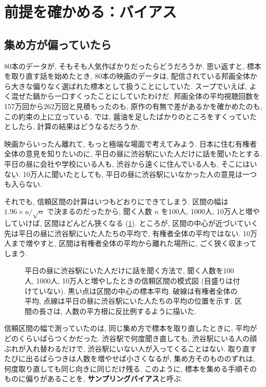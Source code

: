 \section{前提を確かめる：バイアス}

  \subsection{集め方が偏っていたら}

    80本のデータが, そもそも人気作ばかりだったらどうだろうか.
    思い返すと, 標本を取り直す話を始めたとき, 80本の映画のデータは, 配信されている邦画全体から大きな偏りなく選ばれた標本として扱うことにしていた.
    スープでいえば, よく混ぜた鍋から一口すくったことにしていたわけだ.
    邦画全体の平均視聴回数を157万回から262万回と見積もったのも, 原作の有無で差があるかを確かめたのも, この約束の上に立っている.
    では, 醤油を足したばかりのところをすくっていたとしたら, 計算の結果はどうなるだろうか.

    映画からいったん離れて, もっと極端な場面で考えてみよう.
    日本に住む有権者全体の意見を知りたいのに, 平日の昼に渋谷駅にいた人だけに話を聞いたとする.
    平日の昼に会社や学校にいる人も, 渋谷から遠くに住んでいる人も, そこにはいない.
    10万人に聞いたとしても, 平日の昼に渋谷駅にいなかった人の意見は一つも入らない.

    それでも, 信頼区間の計算はいつもどおりにできてしまう.
    区間の幅は $1.96 \times u / \sqrt{n}$ で決まるのだったから, 聞く人数 $n$ を100人, 1000人, 10万人と増やしていけば, 区間はどんどん狭くなる (\cref{fig:ch07-biased-n}).
    ところが, 区間の中心が近づいていく先は平日の昼に渋谷駅にいた人たちの平均で, 有権者全体の平均ではない.
    10万人まで増やすと, 区間は有権者全体の平均から離れた場所に, ごく狭く収まってしまう.

    \begin{figure}[htbp]
      \centering
      
      \caption{平日の昼に渋谷駅にいた人だけに話を聞く方法で, 聞く人数を100人, 1000人, 10万人と増やしたときの信頼区間の模式図 (目盛りは付けていない). 黒い点は区間の中心の標本平均. 破線は有権者全体の平均, 点線は平日の昼に渋谷駅にいた人たちの平均の位置を示す. 区間の長さは, 人数の平方根に反比例するように描いた.}
      \label{fig:ch07-biased-n}
    \end{figure}

    信頼区間の幅で測っていたのは, 同じ集め方で標本を取り直したときに, 平均がどのくらいばらつくかだった.
    渋谷駅で何度聞き直しても, 渋谷駅にいる人の顔ぶれが入れ替わるだけで, 渋谷駅にいない人が入ってくることはない.
    取り直すたびに出るばらつきは人数を増やせば小さくなるが, 集め方そのもののずれは, 何度取り直しても同じ向きに同じだけ残る.
    このように, 標本を集める手順そのものに偏りがあることを, \textbf{サンプリングバイアス}と呼ぶ.

